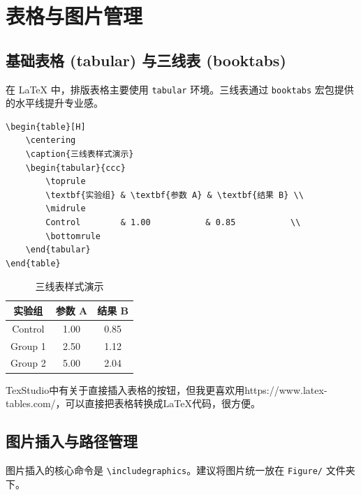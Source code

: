 \chapter{表格与图片管理}

\section{基础表格 (tabular) 与三线表 (booktabs)}

在 \LaTeX{} 中，排版表格主要使用 \texttt{tabular} 环境。三线表通过 \texttt{booktabs} 宏包提供的水平线提升专业感。

\begin{lstlisting}[language={[LaTeX]TeX}, caption={三线表源码}, frame=single]
\begin{table}[H]
    \centering
    \caption{三线表样式演示}
    \begin{tabular}{ccc}
        \toprule
        \textbf{实验组} & \textbf{参数 A} & \textbf{结果 B} \\
        \midrule
        Control        & 1.00           & 0.85           \\
        \bottomrule
    \end{tabular}
\end{table}
\end{lstlisting}

\begin{table}[H]
    \centering
    \caption{三线表样式演示}
    \begin{tabular}{ccc}
        \toprule
        \textbf{实验组} & \textbf{参数 A} & \textbf{结果 B} \\
        \midrule
        Control        & 1.00           & 0.85           \\
        Group 1        & 2.50           & 1.12           \\
        Group 2        & 5.00           & 2.04           \\
        \bottomrule
    \end{tabular}
\end{table}

TexStudio中有关于直接插入表格的按钮，但我更喜欢用https://www.latex-tables.com/，可以直接把表格转换成\LaTeX 代码，很方便。
\section{图片插入与路径管理}

图片插入的核心命令是 \texttt{\textbackslash includegraphics}。建议将图片统一放在 \texttt{Figure/} 文件夹下。

